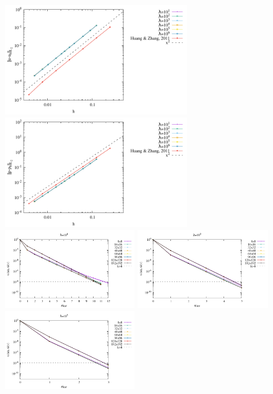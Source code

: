 \begin{center}
\includegraphics[width=8cm]{python_codes/fieldstone_161/results/bench2/errorsV.pdf}
\includegraphics[width=8cm]{python_codes/fieldstone_161/results/bench2/errorsP.pdf}\\
\includegraphics[width=5.7cm]{python_codes/fieldstone_161/results/bench2/conv1.pdf}
\includegraphics[width=5.7cm]{python_codes/fieldstone_161/results/bench2/conv2.pdf}
\includegraphics[width=5.7cm]{python_codes/fieldstone_161/results/bench2/conv3.pdf}\\

\end{center}
